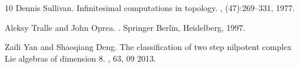 \documentclass[10pt,reqno]{amsart}
\theoremstyle{definition}
\begin{document}
\begin{thebibliography}{10}
Dennis Sullivan.
\newblock Infinitesimal computations in topology.
, (47):269--331, 1977.

Aleksy Tralle and John Oprea.
.
\newblock Springer Berlin, Heidelberg, 1997.

Zaili Yan and Shaoqiang Deng.
\newblock The classification of two step nilpotent complex {L}ie algebras of
  dimension 8.
, 63, 09 2013.

\end{thebibliography}


%
\end{document}

